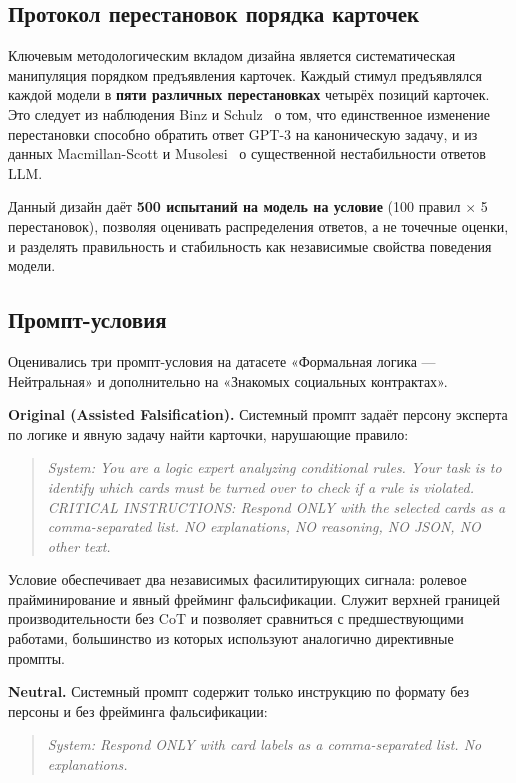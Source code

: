 \subsection{Протокол перестановок порядка карточек}

Ключевым методологическим вкладом дизайна является систематическая манипуляция порядком предъявления карточек. Каждый стимул предъявлялся каждой модели в \textbf{пяти различных перестановках} четырёх позиций карточек. Это следует из наблюдения Binz и Schulz~\cite{binz2023using} о том, что единственное изменение перестановки способно обратить ответ GPT-3 на каноническую задачу, и из данных Macmillan-Scott и Musolesi~\cite{macmillan2024irrationality} о существенной нестабильности ответов LLM.

Данный дизайн даёт \textbf{500 испытаний на модель на условие} (100 правил $\times$ 5 перестановок), позволяя оценивать распределения ответов, а не точечные оценки, и разделять правильность и стабильность как независимые свойства поведения модели.

\subsection{Промпт-условия}

Оценивались три промпт-условия на датасете «Формальная логика --- Нейтральная» и дополнительно на «Знакомых социальных контрактах».

\textbf{Original (Assisted Falsification).} Системный промпт задаёт персону эксперта по логике и явную задачу найти карточки, нарушающие правило:

\begin{quote}
\textit{System: You are a logic expert analyzing conditional rules. Your task is to identify which cards must be turned over to check if a rule is violated. CRITICAL INSTRUCTIONS: Respond ONLY with the selected cards as a comma-separated list. NO explanations, NO reasoning, NO JSON, NO other text.}
\end{quote}

Условие обеспечивает два независимых фасилитирующих сигнала: ролевое прайминирование и явный фрейминг фальсификации. Служит верхней границей производительности без CoT и позволяет сравниться с предшествующими работами, большинство из которых используют аналогично директивные промпты.

\textbf{Neutral.} Системный промпт содержит только инструкцию по формату без персоны и без фрейминга фальсификации:

\begin{quote}
\textit{System: Respond ONLY with card labels as a comma-separated list. No explanations.}
\end{quote}

